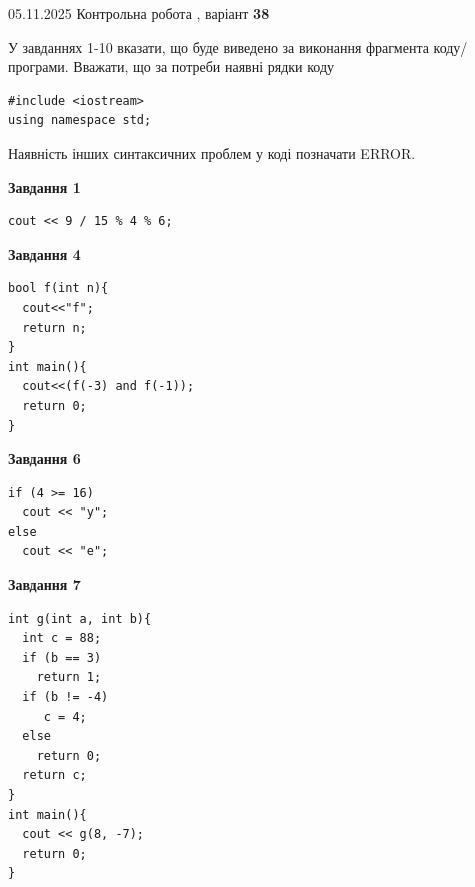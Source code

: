 \documentclass[12pt, ukrainian]{article}
\begin{document}
\newpage

{\Large{05.11.2025 Контрольна робота , варіант  \No \textbf { 38 }\par}}
{
\begin {large}
У завданнях 1-10 вказати, що буде виведено за виконання фрагмента коду/про\-гра\-ми.
Вважати, що за потреби наявні рядки коду
\begin{verbatim}
#include <iostream>
using namespace std;
\end{verbatim}
Наявність інших синтаксичних проблем у коді позначати ERROR.

\begin{minipage}[t]{7.0cm}

\begin{center}
\textbf{Завдання 1}
\end{center}
\vspace{-8mm}

\begin{verbatim}
cout << 9 / 15 % 4 % 6;
\end{verbatim}



\begin{center}
\textbf{Завдання 4}
\end{center}
\vspace{-8mm}

\begin{verbatim}
bool f(int n){
  cout<<"f";
  return n;
}
int main(){
  cout<<(f(-3) and f(-1));
  return 0;
}
\end{verbatim}



\begin{center}
\textbf{Завдання 6}
\end{center}
\vspace{-8mm}

\begin{verbatim}
if (4 >= 16)
  cout << "y";
else
  cout << "e";
\end{verbatim}



\begin{center}
\textbf{Завдання 7}
\end{center}
\vspace{-8mm}

\begin{verbatim}
int g(int a, int b){
  int c = 88;
  if (b == 3)
    return 1;
  if (b != -4)
     c = 4;
  else
    return 0;
  return c;
}
int main(){
  cout << g(8, -7);
  return 0;
}
\end{verbatim}


\end{minipage}
\end{large}}
\end{document}
